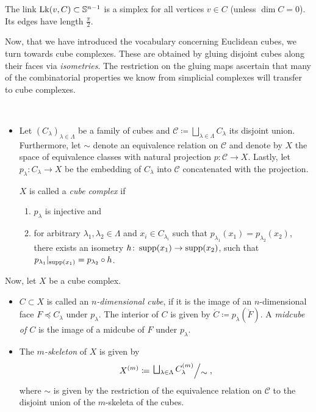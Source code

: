 \begin{rem}
  The link \(\operatorname{Lk}(v,C) \subset \mathbb{S}^{n-1}\) is a simplex for all vertices \(v \in C\) (unless \(\dim C= 0\)). Its edges have length \(\frac{\pi}{2}\).
\end{rem}

Now, that we have introduced the vocabulary concerning Euclidean cubes, we turn towards cube complexes. These are obtained by gluing disjoint cubes along their faces via \emph{isometries}. The restriction on the gluing maps ascertain that many of the combinatorial properties we know from simplicial complexes will transfer to cube complexes.

\begin{defin}~\vspace{-6pt}
  \begin{itemize}
  \item Let \((C_\lambda)_{\lambda \in \Lambda}\) be a family of cubes and \(\mathcal{C} \coloneqq \bigsqcup_{\lambda \in \Lambda} C_\lambda\) its disjoint union. Furthermore, let \(\sim\) denote an equivalence relation on \(\mathcal{C}\) and denote by \(X\) the space of equivalence classes with natural projection \(p \colon \mathcal{C} \to X\). Lastly, let \(p_\lambda \colon C_\lambda \to X\) be the embedding of \(C_\lambda\) into \(\mathcal{C}\) concatenated with the projection.

    \(X\) is called a \emph{cube complex} if
    \begin{enumerate}
    \item \(p_\lambda\) is injective and
    \item for arbitrary \(\lambda_1, \lambda_2 \in \Lambda\) and \(x_i \in C_{\lambda_i}\) such that \(p_{\lambda_1}(x_1) = p_{\lambda_2}(x_2)\), there exists an isometry \(h\colon \operatorname{supp}(x_1) \to \operatorname{supp}(x_2)\), such that \(p_{\lambda_1}|_{\operatorname{supp}(x_1)} = p_{\lambda_2} \circ h\).
    \end{enumerate}
  \end{itemize}
  Now, let \(X\) be a cube complex.
  \begin{itemize}
  \item \(C \subset X\) is called an \emph{\(n\)-dimensional cube}, if it is the image of an \(n\)-dimensional face \(F \preceq C_\lambda\) under \(p_\lambda\). The interior of \(C\) is given by \(\mathring C \coloneqq p_\lambda(\mathring F)\). A \emph{midcube of \(C\)} is the image of a midcube of \(F\) under \(p_\lambda\).
  \item The \emph{\(m\)-skeleton} of \(X\) is given by
    \begin{align*}
      X^{(m)} \coloneqq \quot{\bigsqcup_{\lambda \in \Lambda} C_\lambda^{(m)}}{\sim},
    \end{align*}
    where \(\sim\) is given by the restriction of the equivalence relation on \(\mathcal{C}\) to the disjoint union of the \(m\)-skeleta of the cubes.


\end{itemize}
\end{defin}
